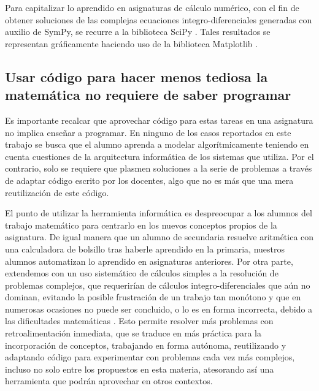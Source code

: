 \documentclass[a4paper]{fodami}        %
\begin{document}
Para capitalizar lo aprendido en asignaturas de cálculo numérico, con el fin de obtener soluciones de las complejas ecuaciones integro-diferenciales generadas con auxilio de SymPy, se recurre a la biblioteca SciPy \cite{2020SciPy-NMeth}.
Tales resultados se representan gráficamente haciendo uso de la biblioteca Matplotlib \cite{Hunter:2007}.


\subsection{Usar código para hacer menos tediosa la matemática no requiere de saber programar}

Es importante recalcar que aprovechar código para estas tareas en una asignatura no implica enseñar a programar.
En ninguno de los casos reportados en este trabajo se busca que el alumno aprenda a modelar algorítmicamente teniendo en cuenta cuestiones de la arquitectura informática de los sistemas que utiliza.
Por el contrario, solo se requiere que plasmen soluciones a la serie de problemas a través de adaptar código escrito por los docentes, algo que no es más que una mera reutilización de este código.

El punto de utilizar la herramienta informática es despreocupar a los alumnos del trabajo matemático para centrarlo en los nuevos conceptos propios de la asignatura.
De igual manera que un alumno de secundaria resuelve aritmética con una calculadora de bolsillo tras haberle aprendido en la primaria, nuestros alumnos automatizan lo aprendido en asignaturas anteriores.
Por otra parte, extendemos con un uso sistemático de cálculos simples a la resolución de problemas complejos, que requerirían de cálculos integro-diferenciales que aún no dominan, evitando la posible frustración de un trabajo tan monótono y que en numerosas ocasiones no puede ser concluido, o lo es en forma incorrecta, debido a las dificultades matemáticas \cite{Pekrun2006}.
Esto permite resolver más problemas con retroalimentación inmediata, que se traduce en más práctica para la incorporación de conceptos, trabajando en forma autónoma, reutilizando y adaptando código para experimentar con problemas cada vez más complejos, incluso no solo entre los propuestos en esta materia, atesorando así una herramienta que podrán aprovechar en otros contextos.
\end{document}
